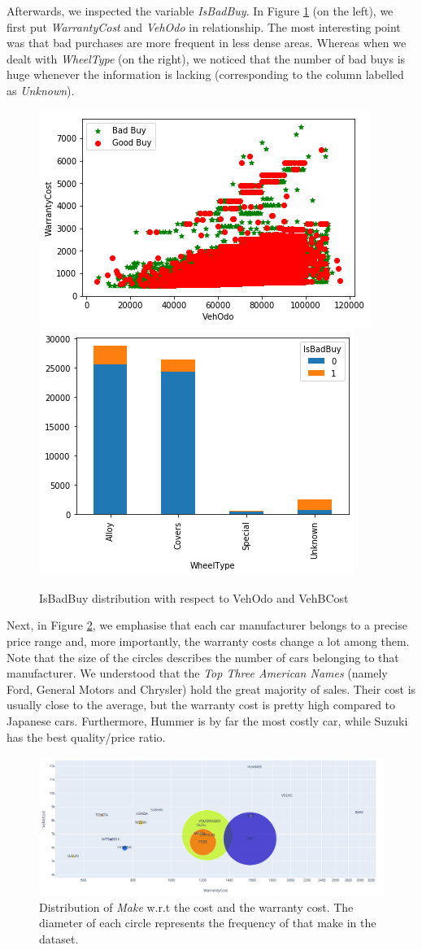 \documentclass{article}
\begin{document}
	
	Afterwards, we inspected the variable \emph{IsBadBuy}. In Figure \ref{fig:badbuys} (on the left), we first put \emph{WarrantyCost} and \emph{VehOdo} in relationship. The most interesting point was that bad purchases are more frequent in less dense areas. Whereas when we dealt with \emph{WheelType} (on the right), we noticed that the number of bad buys is huge whenever the information is lacking (corresponding to the column labelled as \emph{Unknown}).
	
	
	\begin{figure}[H]
		\centering
		\includegraphics[width=.4\textwidth, keepaspectratio]{badbuys} \hspace{1cm}
		\includegraphics[width=.33\textwidth, keepaspectratio]{wheeltype}
		\caption{IsBadBuy distribution with respect to VehOdo and VehBCost}
		\label{fig:badbuys}
	\end{figure}
	
	Next, in Figure \ref{fig:fantastic}, we emphasise that each car manufacturer belongs to a precise price range and, more importantly, the warranty costs change a lot among them. Note that the size of the circles describes the number of cars belonging to that manufacturer. We understood that the \emph{Top Three American Names} (namely Ford, General Motors and Chrysler) hold the great majority of sales. Their cost is usually close to the average, but the warranty cost is pretty high compared to Japanese cars. Furthermore, Hummer is by far the most costly car, while Suzuki has the best quality/price ratio.
	
	
	\begin{figure}[H]
		\centering
		\captionsetup{justification=centering}
		\includegraphics[width=.95\textwidth, keepaspectratio]{fantastic.png} 
		\caption{Distribution of \emph{Make} w.r.t the cost and the warranty cost. The diameter of each circle represents the frequency of that make in the dataset.}
		\label{fig:fantastic}
	\end{figure}
	
\end{document}
